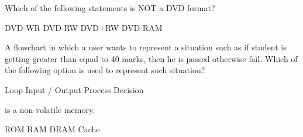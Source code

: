 \documentclass[a4paper]{exam}
\begin{document}
\begin{questions}
\question Which of the following statements is NOT a DVD format?

\begin{oneparchoices}
    \choice DVD-WR
    \choice DVD-RW
    \choice DVD+RW
    \choice DVD-RAM
\end{oneparchoices}

\question A flowchart in which a user wants to represent a situation such as if student is getting greater than equal to 40 marks, then he is passed otherwise fail. Which of the following option is used to represent such situation?

\begin{oneparchoices}
    \choice Loop
    \choice Input / Output
    \choice Process
    \choice Decision
\end{oneparchoices}

\question \fillin[100] is a non-volatile memory.

\begin{oneparchoices}
    \choice ROM
    \choice RAM
    \choice DRAM
    \choice Cache
\end{oneparchoices}

\end{questions}


\end{document}

